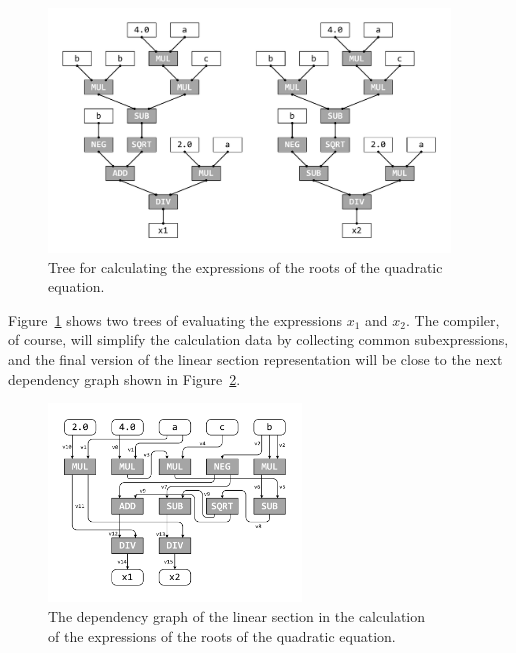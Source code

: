 \documentclass[
11pt,%
tightenlines,%
twoside,%
onecolumn,%
nofloats,%
nobibnotes,%
nofootinbib,%
superscriptaddress,%
noshowpacs,%
centertags]%
{revtex4}
\begin{document}
\begin{figure}[h]
\setcaptionmargin{5mm}
\includegraphics[width=0.95\textwidth]{pics/square_equation_calculation_tree.pdf}
\caption{Tree for calculating the expressions of the roots of the quadratic equation.}\label{fig:square_equation_calculation_tree}
\end{figure}

Figure~\ref{fig:square_equation_calculation_tree} shows two trees of evaluating the expressions $x_1$ and $x_2$. The compiler, of course, will simplify the calculation data by collecting common subexpressions, and the final version of the linear section representation will be close to the next dependency graph shown in Figure~\ref{fig:def_use}.

\begin{figure}[h]
\setcaptionmargin{5mm}
\onelinecaptionsfalse %
\includegraphics[width=0.60\textwidth]{pics/def_use.pdf}
\caption{The dependency graph of the linear section in the calculation \\ of the expressions of the roots of the quadratic equation.}\label{fig:def_use}
\end{figure}
\end{document}
